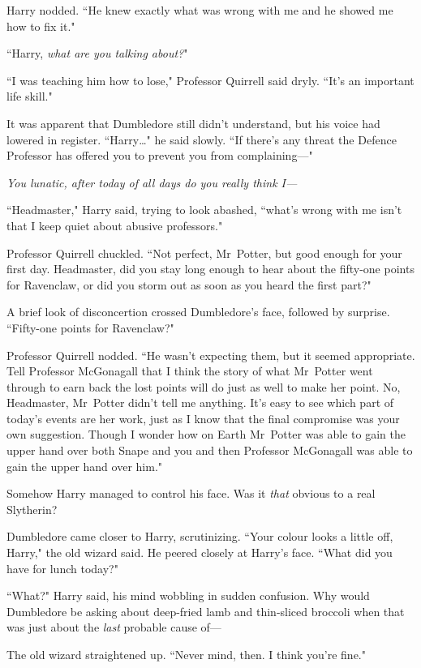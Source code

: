 Harry nodded. ``He knew exactly what was wrong with me and he showed me how to fix it."

``Harry, \emph{what are you talking about?}"

``I was teaching him how to lose," Professor Quirrell said dryly. ``It's an important life skill."

It was apparent that Dumbledore still didn't understand, but his voice had lowered in register. ``Harry…" he said slowly. ``If there's any threat the Defence Professor has offered you to prevent you from complaining—"

\emph{You lunatic, after today of all days do you really think I—}

``Headmaster," Harry said, trying to look abashed, ``what's wrong with me isn't that I keep quiet about abusive professors."

Professor Quirrell chuckled. ``Not perfect, Mr~Potter, but good enough for your first day. Headmaster, did you stay long enough to hear about the fifty-one points for Ravenclaw, or did you storm out as soon as you heard the first part?"

A brief look of disconcertion crossed Dumbledore's face, followed by surprise. ``Fifty-one points for Ravenclaw?"

Professor Quirrell nodded. ``He wasn't expecting them, but it seemed appropriate. Tell Professor McGonagall that I think the story of what Mr~Potter went through to earn back the lost points will do just as well to make her point. No, Headmaster, Mr~Potter didn't tell me anything. It's easy to see which part of today's events are her work, just as I know that the final compromise was your own suggestion. Though I wonder how on Earth Mr~Potter was able to gain the upper hand over both Snape and you and then Professor McGonagall was able to gain the upper hand over him."

Somehow Harry managed to control his face. Was it \emph{that} obvious to a real Slytherin?

Dumbledore came closer to Harry, scrutinizing. ``Your colour looks a little off, Harry," the old wizard said. He peered closely at Harry's face. ``What did you have for lunch today?"

``What?" Harry said, his mind wobbling in sudden confusion. Why would Dumbledore be asking about deep-fried lamb and thin-sliced broccoli when that was just about the \emph{last} probable cause of—

The old wizard straightened up. ``Never mind, then. I think you're fine."

